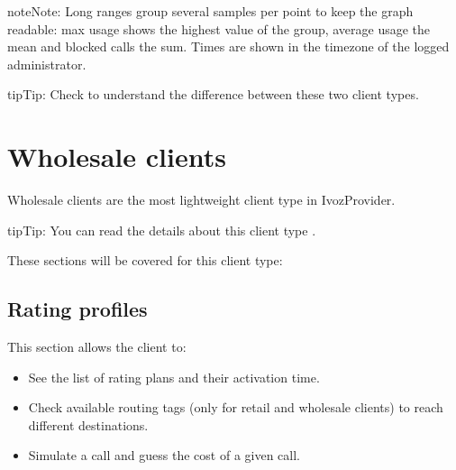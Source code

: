 \documentclass[letterpaper,10pt,english]{sphinxmanual}
\begin{document}
\begin{notice}{note}{Note:}
Long ranges group several samples per point to keep the graph readable: max usage shows the highest value
of the group, average usage the mean and blocked calls the sum. Times are shown in the timezone of the
logged administrator.
\end{notice}

\begin{notice}{tip}{Tip:}
Check {\hyperref[administration_portal/brand/clients/retail:differences\string-between\string-retail\string-and\string-residential\string-clients]{}} to understand the difference between these two
client types.
\end{notice}
\label{administration_portal/client/wholesale/index:wholesale-clients}

\section{Wholesale clients}
\label{administration_portal/client/wholesale/index:clientes-wholesale}\label{administration_portal/client/wholesale/index:wholesale-clients}\label{administration_portal/client/wholesale/index::doc}\label{administration_portal/client/wholesale/index:id1}
Wholesale clients are the most lightweight client type in IvozProvider.

\begin{notice}{tip}{Tip:}
You can read the details about this client type {\hyperref[administration_portal/brand/clients/wholesale:wholesale\string-clients]{}}.
\end{notice}

These sections will be covered for this client type:


\subsection{Rating profiles}
\label{administration_portal/client/wholesale/rating_profiles:rating-profiles}\label{administration_portal/client/wholesale/rating_profiles::doc}
This section allows the client to:
\begin{itemize}
\item {} 
See the list of rating plans and their activation time.

\item {} 
Check available routing tags (only for retail and wholesale clients) to reach different destinations.

\item {} 
Simulate a call and guess the cost of a given call.

\end{itemize}
\end{document}
